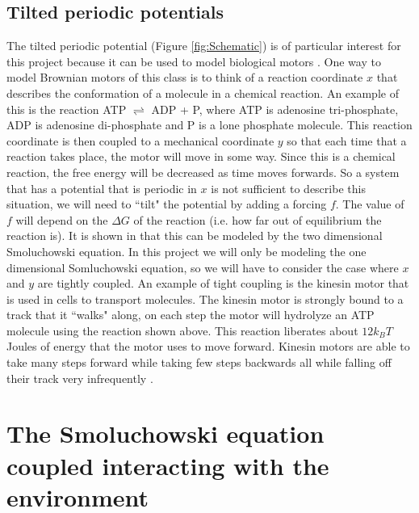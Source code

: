 \subsection{Tilted periodic potentials}
The tilted periodic potential (Figure \ref{fig:Schematic}) is of particular interest for this project because it can be used to model biological motors \cite{Leibler1993,Magnasco1994}. One way to model Brownian motors of this class is to think of a reaction coordinate $x$ that describes the conformation of a molecule in a chemical reaction. An example of this is the reaction ATP $\rightleftharpoons$ ADP + P, where ATP is adenosine tri-phosphate, ADP is adenosine di-phosphate and P is a lone phosphate molecule. This reaction coordinate is then coupled to a mechanical coordinate $y$ so that each time that a reaction takes place, the motor will move in some way. Since this is a chemical reaction, the free energy will be decreased as time moves forwards. So a system that has a potential that is periodic in $x$ is not sufficient to describe this situation, we will need to ``tilt" the potential by adding a forcing $f$. The value of $f$ will depend on the $\Delta G$ of the reaction (i.e. how far out of equilibrium the reaction is). It is shown in \cite{Magnasco1994} that this can be modeled by the two dimensional Smoluchowski equation. In this project we will only be modeling the one dimensional Somluchowski equation, so we will have to consider the case where $x$ and $y$ are tightly coupled. An example of tight coupling is the kinesin motor \cite{Leibler1993} that is used in cells to transport molecules. The kinesin motor is strongly bound to a track that it ``walks" along, on each step the motor will hydrolyze an ATP molecule using the reaction shown above. This reaction liberates about $12 k_B T$ Joules of energy that the motor uses to move forward. Kinesin motors are able to take many steps forward while taking few steps backwards all while falling off their track very infrequently \cite{BlockSM1990}.

\section{The Smoluchowski equation coupled interacting with the environment} \label{Smoluchowski}

